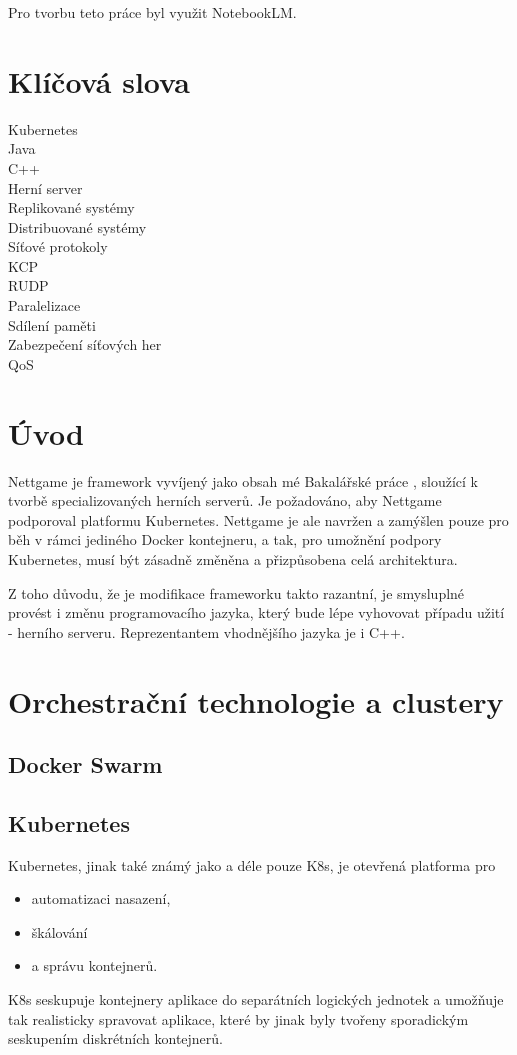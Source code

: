 \documentclass{article}
\begin{document}
\newpage

\tableofcontents

\newpage

Pro tvorbu teto práce byl využit NotebookLM.

\newpage

\section*{Klíčová slova}
Kubernetes\\
Java\\
C++\\
Herní server\\
Replikované systémy\\
Distribuované systémy\\
Síťové protokoly\\
KCP\\
RUDP\\
Paralelizace\\
Sdílení paměti\\
Zabezpečení síťových her\\
QoS

\newpage
\section{Úvod}

Nettgame je framework vyvíjený jako obsah mé Bakalářské práce 
\cite{moncek_theses}, sloužící k tvorbě specializovaných herních serverů. Je požadováno, aby Nettgame podporoval platformu Kubernetes. Nettgame je ale navržen a zamýšlen pouze pro běh v rámci jediného Docker kontejneru, a tak, pro umožnění podpory Kubernetes, musí být zásadně změněna a přizpůsobena celá architektura.

Z toho důvodu, že je modifikace frameworku takto razantní, je smysluplné provést i změnu programovacího jazyka, který bude lépe vyhovovat případu užití - herního serveru. Reprezentantem vhodnějšího jazyka je i C++.

\newpage

\section{Orchestrační technologie a clustery}
\subsection{Docker Swarm}
\subsection{Kubernetes}
Kubernetes, jinak také známý jako a déle pouze K8s, je otevřená platforma pro
\begin{itemize}
    \item automatizaci nasazení, 
    \item škálování
    \item a správu kontejnerů.
\end{itemize} K8s seskupuje kontejnery aplikace do separátních logických jednotek a umožňuje tak realisticky spravovat aplikace, které by jinak byly tvořeny sporadickým seskupením diskrétních kontejnerů.
\end{document}
